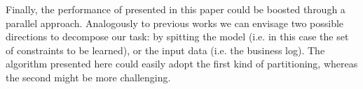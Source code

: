 Finally, the performance of \nd presented in this paper could be boosted through a parallel approach. Analogously to previous works \cite{2018a-Maggi, 2018-Loreti, 2020b-Loreti} we can envisage two possible directions to decompose our task: by spitting the model (i.e. in this case the set of constraints to be learned), or the input data (i.e. the business log). The algorithm presented here could easily adopt the first kind of partitioning, whereas the second might be more challenging.
